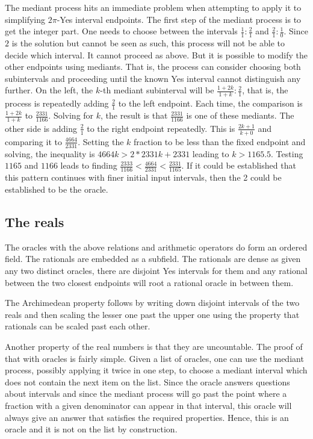 \documentclass[12pt]{article}
\begin{document}
The mediant process hits an immediate problem when attempting to apply it to simplifying $2\pi$-Yes  interval endpoints. The first step of the mediant process is to get the integer part. One needs to choose between the intervals $\frac{1}{1}:\frac{2}{1}$ and $\frac{2}{1}:\frac{1}{0}$. Since $2$ is the solution but cannot be seen as such, this process will not be able to decide which interval. It cannot proceed as above. But it is possible to modify the other endpoints using mediants. That is, the process can consider choosing both subintervals and proceeding until the known Yes interval cannot distinguish any further. On the left, the $k$-th mediant subinterval will be $\frac{1 + 2k}{1+k}:\frac{2}{1}$, that is, the process is repeatedly adding $\frac{2}{1}$ to the left endpoint. Each time, the comparison is $\frac{1+2k}{1+k}$ to $\frac{2331}{1166}$. Solving for $k$, the result is that $\frac{2331}{1166}$ is one of these mediants. The other side is adding $\frac{2}{1}$ to the right endpoint repeatedly. This is $\frac{2k + 1}{k+0}$ and comparing it to $\frac{4664}{2331}$. Setting the $k$ fraction to be less than the fixed endpoint and solving, the inequality is $4664k > 2*2331 k + 2331$ leading to $k > 1165.5$. Testing $1165$ and $1166$ leads to finding $\frac{2333}{1166} < \frac{4664}{2331} < \frac{2331}{1165}$. If it could be established that this pattern continues with finer initial input intervals, then the 2 could be established to be the oracle. 



\subsection{The reals}

The oracles with the above relations and arithmetic operators do form an ordered field. The rationals are embedded as a subfield. The rationals are dense as given any two distinct oracles, there are disjoint Yes intervals for them and any rational between the two closest endpoints will root a rational oracle in between them. 

The Archimedean property follows by  writing down disjoint intervals of the two reals and then scaling the lesser one past the upper one using the property that rationals can be scaled past each other. 

Another property of the real numbers is that they are uncountable. The proof of that with oracles is fairly simple. Given a list of oracles, one can use the mediant process, possibly applying it twice in one step, to choose a mediant interval which does not contain the next item on the list. Since the oracle answers questions about intervals and since the mediant process will go past the point where a fraction with a given denominator can appear in that interval, this oracle will always give an answer that satisfies the required properties.  Hence, this is an oracle and it is not on the list by construction. 
\end{document}
